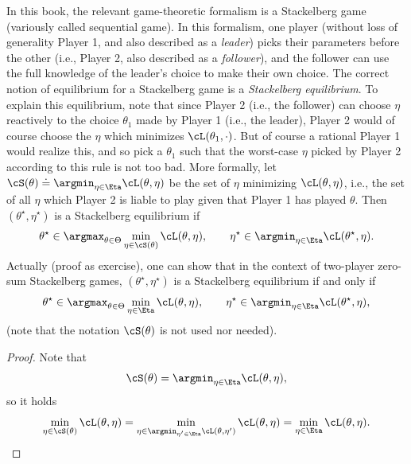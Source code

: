 \documentclass[../../book-main.tex]{subfiles}
\begin{document}
In this book, the relevant game-theoretic formalism is a Stackelberg
game (variously called sequential game). In this formalism, one
player (without loss of generality Player 1, and also described as a
\textit{leader}) picks their parameters before the other (i.e.,
Player 2, also described as a \textit{follower}), and the follower
can use the full knowledge of the leader's choice to make their own
choice. The correct notion of equilibrium for a Stackelberg game is a
\textit{Stackelberg equilibrium}. To explain this equilibrium, note
that since Player 2 (i.e., the follower) can choose \(\eta\)
reactively to the choice \(\theta_{1}\) made by Player 1 (i.e., the
leader), Player 2 would of course choose the \(\eta\) which minimizes
\(\cL(\theta_{1}, \cdot)\). But of course a rational Player 1 would
realize this, and so pick a \(\theta_{1}\) such that the worst-case
\(\eta\) picked by Player 2 according to this rule is not too bad.
More formally, let \(\cS(\theta) \doteq \argmin_{\eta \in
\Eta}\cL(\theta, \eta)\) be the set of \(\eta\) minimizing
\(\cL(\theta, \eta)\), i.e., the set of all \(\eta\) which Player 2
is liable to play given that Player 1 has played \(\theta\). Then
\((\theta^{\star}, \eta^{\star})\) is a Stackelberg equilibrium if
\begin{equation}
    \theta^{\star} \in \argmax_{\theta \in \Theta}\min_{\eta \in
    \cS(\theta)}\cL(\theta, \eta), \qquad \eta^{\star} \in
    \argmin_{\eta  \in \Eta}\cL(\theta^{\star}, \eta).
\end{equation}
Actually (proof as exercise), one can show that in the context of
two-player zero-sum Stackelberg games, \((\theta^{\star},
\eta^{\star})\) is a Stackelberg equilibrium if and only if
\begin{equation}
    \theta^{\star} \in \argmax_{\theta \in \Theta}\min_{\eta \in
    \Eta}\cL(\theta, \eta), \qquad \eta^{\star} \in \argmin_{\eta
    \in \Eta}\cL(\theta^{\star}, \eta),
\end{equation}
(note that the notation \(\cS(\theta)\) is not used nor needed).
\begin{proof} %
    Note that
    \begin{equation}
        \cS(\theta) = \argmin_{\eta \in \Eta}\cL(\theta, \eta),
    \end{equation}
    so it holds
    \begin{equation}
        \min_{\eta \in \cS(\theta)}\cL(\theta, \eta) = \min_{\eta \in
            \argmin_{\eta^{\prime} \in \Eta}\cL(\theta,
        \eta^{\prime})}\cL(\theta, \eta) = \min_{\eta \in
        \Eta}\cL(\theta, \eta).
    \end{equation}
\end{proof}
\end{document}
